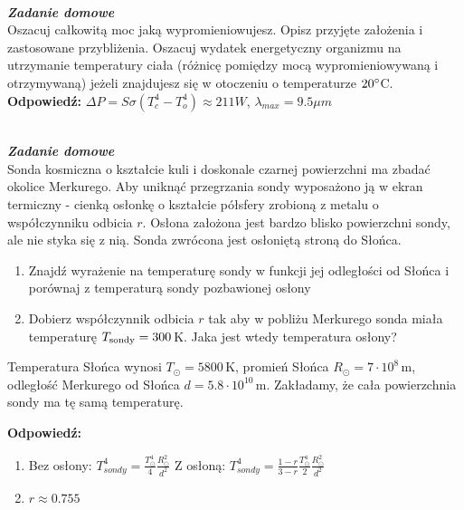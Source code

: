 \documentclass[11pt,a4paper]{article}
\newcounter{zaddom}\newcommand{\zaddom}[1][]{\addtocounter{zaddom}{1} ~\\  {\bf \emph{Zadanie domowe \arabic{zaddom} #1 }} \\}
\begin{document}
\newpage

\zaddom
Oszacuj całkowitą moc jaką wypromieniowujesz. Opisz przyjęte założenia i zastosowane przybliżenia. Oszacuj
wydatek energetyczny organizmu na utrzymanie temperatury ciała (różnicę pomiędzy mocą wypromieniowywaną
i otrzymywaną) jeżeli znajdujesz się w otoczeniu o temperaturze $20\degree$C.
\vskip 10pt
\textbf{Odpowiedź:}
$\Delta P = S \sigma (T_c^4-T_o^4) \approx 211 W$, $\lambda_{max} = 9.5 \mu m$

\zaddom
Sonda kosmiczna o kształcie kuli i doskonale czarnej powierzchni ma zbadać okolice Merkurego. Aby uniknąć
przegrzania sondy wyposażono ją w ekran termiczny - cienką osłonkę o kształcie półsfery zrobioną z metalu
o współczynniku odbicia $r$. Osłona założona jest bardzo blisko powierzchni sondy, ale nie styka się z nią. Sonda
zwrócona jest osłoniętą stroną do Słońca.
\begin{enumerate}
\item Znajdź wyrażenie na temperaturę sondy w funkcji jej odległości od Słońca i porównaj z temperaturą sondy
pozbawionej osłony
\item Dobierz współczynnik odbicia $r$ tak aby w pobliżu Merkurego sonda miała temperaturę $T_{\rm sondy}= 300$\,K. 
Jaka jest wtedy temperatura osłony?
\end{enumerate}
Temperatura Słońca wynosi $T_\odot= 5800$\,K, promień Słońca $R_\odot = 7 \cdot 10^8$\,m, 
odległość Merkurego od Słońca $d = 5.8 \cdot 10^{10}$\,m. 
Zakładamy, że cała powierzchnia sondy ma tę samą temperaturę.

\vskip 10pt
\textbf{Odpowiedź:}
\begin{enumerate}
\item Bez osłony: $T_{sondy}^4 = \frac{T_\odot^4}{4} \frac{R_\odot^2}{d^2}$
Z osłoną: $T_{sondy}^4 = \frac{1-r}{3-r} \frac{T_\odot^4}{2} \frac{R_\odot^2}{d^2}$
\item $r \approx 0.755$
\end{enumerate}
\end{document}
